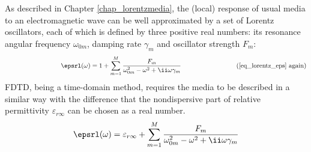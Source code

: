 As described in Chapter \ref{chap_lorentzmedia}, the (local) response of usual media to an electromagnetic wave can be well approximated by a set of Lorentz oscillators, each of which is defined by three positive real numbers: its resonance angular frequency $\omega_{0m}$, damping rate $\gamma_m$ and oscillator strength $F_m$: %
$$\hspace{3cm} \epsrl(\omega) = 1 + \sum_{m=1}^M \frac{F_m}{\omega_{0m}^2 - \omega^2 + \ii\omega\gamma_m} \hspace{3cm}\text{(\ref{eq_lorentz_eps} again)}$$
FDTD, being a time-domain method, requires the media to be described in a similar way with the difference that the nondispersive part of relative permittivity $\varepsilon_{r\infty}$ can be chosen as a real number. 
\begin{equation} \epsrl(\omega) = \varepsilon_{r\infty} + \sum_{m=1}^M \frac{F_m}{\omega_{0m}^2 - \omega^2 + \ii\omega\gamma_m} \label{eq_lorentz_eps_fdtd} \end{equation}







